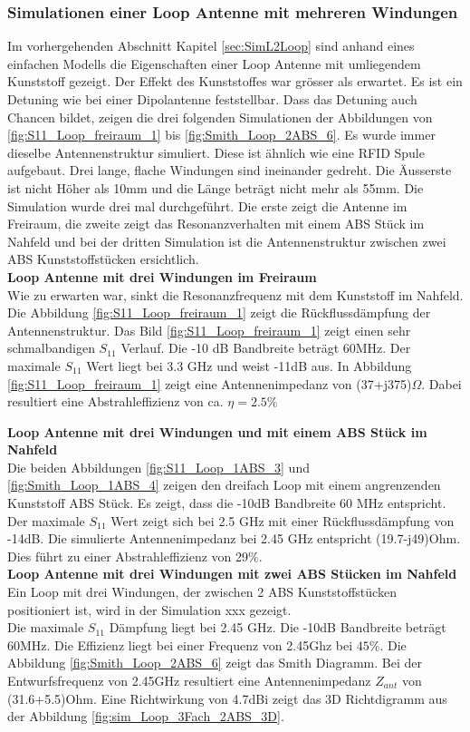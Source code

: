 \subsubsection{Simulationen einer Loop Antenne mit mehreren Windungen}
Im vorhergehenden Abschnitt Kapitel \ref{sec:SimL2Loop} sind anhand eines einfachen Modells die Eigenschaften einer Loop Antenne mit umliegendem Kunststoff gezeigt. Der Effekt des Kunststoffes war grösser als erwartet. Es ist ein Detuning wie bei einer Dipolantenne feststellbar. Dass das Detuning auch Chancen bildet, zeigen die drei folgenden Simulationen der Abbildungen von \ref{fig:S11_Loop_freiraum_1} bis \ref{fig:Smith_Loop_2ABS_6}. Es wurde immer dieselbe Antennenstruktur simuliert. Diese ist ähnlich wie eine RFID Spule aufgebaut. Drei lange, flache Windungen sind ineinander gedreht. Die Äusserste ist nicht Höher als 10mm und die Länge beträgt nicht mehr als 55mm. Die Simulation wurde drei mal durchgeführt. Die erste zeigt die Antenne im Freiraum, die zweite zeigt das Resonanzverhalten mit einem ABS Stück im Nahfeld und bei der dritten Simulation ist die Antennenstruktur zwischen zwei ABS Kunststoffstücken ersichtlich.\\

\textbf{Loop Antenne mit drei Windungen im Freiraum}\\
Wie zu erwarten war, sinkt die Resonanzfrequenz mit dem Kunststoff im Nahfeld. Die Abbildung \ref{fig:S11_Loop_freiraum_1} zeigt  die Rückflussdämpfung der Antennenstruktur. Das Bild \ref{fig:S11_Loop_freiraum_1} zeigt einen sehr schmalbandigen $S_{11}$ Verlauf. Die -10 dB Bandbreite beträgt 60MHz. Der maximale $S_{11}$ Wert liegt bei 3.3 GHz und weist -11dB aus. In Abbildung \ref{fig:S11_Loop_freiraum_1} zeigt eine Antennenimpedanz von (37+j375)$\Omega$. Dabei resultiert eine Abstrahleffizienz von ca. $\eta=2.5\%$


\textbf{Loop Antenne mit drei Windungen und mit einem ABS Stück im Nahfeld}\\
Die beiden Abbildungen \ref{fig:S11_Loop_1ABS_3} und \ref{fig:Smith_Loop_1ABS_4} zeigen den dreifach Loop mit einem angrenzenden Kunststoff ABS Stück. Es zeigt, dass  die -10dB Bandbreite  60 MHz entspricht. Der maximale $S_{11}$ Wert zeigt sich bei 2.5 GHz mit einer Rückflussdämpfung von -14dB. Die simulierte Antennenimpedanz bei 2.45 GHz entspricht (19.7-j49)Ohm. Dies führt zu einer Abstrahleffizienz von 29$\%$.\\

\textbf{Loop Antenne mit drei Windungen mit zwei ABS Stücken im Nahfeld}\\
Ein Loop mit drei Windungen, der zwischen 2 ABS Kunststoffstücken positioniert ist, wird in der  Simulation xxx gezeigt.
\\
Die maximale $S_{11}$ Dämpfung liegt bei 2.45 GHz. Die -10dB Bandbreite beträgt 60MHz. Die Effizienz liegt bei einer Frequenz von 2.45Ghz bei $45\%$. Die Abbildung \ref{fig:Smith_Loop_2ABS_6} zeigt das Smith Diagramm. Bei der Entwurfsfrequenz von 2.45GHz resultiert eine Antennenimpedanz $Z_{ant}$ von (31.6+5.5)Ohm.
Eine Richtwirkung von 4.7dBi zeigt das 3D Richtdigramm aus der Abbildung \ref{fig:sim_Loop_3Fach_2ABS_3D}.

